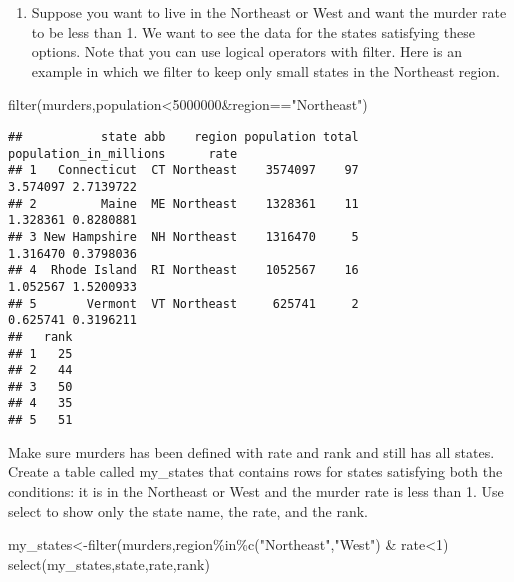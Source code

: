 \documentclass[
]{article}
\newenvironment{Shaded}{\begin{snugshade}}{\end{snugshade}}
\newcommand{\DecValTok}[1]{\textcolor[rgb]{0.00,0.00,0.81}{#1}}
\newcommand{\FunctionTok}[1]{\textcolor[rgb]{0.00,0.00,0.00}{#1}}
\newcommand{\NormalTok}[1]{#1}
\newcommand{\OtherTok}[1]{\textcolor[rgb]{0.56,0.35,0.01}{#1}}
\newcommand{\SpecialCharTok}[1]{\textcolor[rgb]{0.00,0.00,0.00}{#1}}
\newcommand{\StringTok}[1]{\textcolor[rgb]{0.31,0.60,0.02}{#1}}
\providecommand{\tightlist}{%
  \setlength{\itemsep}{0pt}\setlength{\parskip}{0pt}}
\begin{document}
\begin{enumerate}
\def\labelenumi{\arabic{enumi}.}
\setcounter{enumi}{6}
\tightlist
\item
  Suppose you want to live in the Northeast or West and want the murder
  rate to be less than 1. We want to see the data for the states
  satisfying these options. Note that you can use logical operators with
  filter. Here is an example in which we filter to keep only small
  states in the Northeast region.
\end{enumerate}

\begin{Shaded}
\begin{Highlighting}[]
\FunctionTok{filter}\NormalTok{(murders,population}\SpecialCharTok{\textless{}}\DecValTok{5000000}\SpecialCharTok{\&}\NormalTok{region}\SpecialCharTok{==}\StringTok{"Northeast"}\NormalTok{)}
\end{Highlighting}
\end{Shaded}

\begin{verbatim}
##           state abb    region population total population_in_millions      rate
## 1   Connecticut  CT Northeast    3574097    97               3.574097 2.7139722
## 2         Maine  ME Northeast    1328361    11               1.328361 0.8280881
## 3 New Hampshire  NH Northeast    1316470     5               1.316470 0.3798036
## 4  Rhode Island  RI Northeast    1052567    16               1.052567 1.5200933
## 5       Vermont  VT Northeast     625741     2               0.625741 0.3196211
##   rank
## 1   25
## 2   44
## 3   50
## 4   35
## 5   51
\end{verbatim}

Make sure murders has been defined with rate and rank and still has all
states. Create a table called my\_states that contains rows for states
satisfying both the conditions: it is in the Northeast or West and the
murder rate is less than 1. Use select to show only the state name, the
rate, and the rank.

\begin{Shaded}
\begin{Highlighting}[]
\NormalTok{my\_states}\OtherTok{\textless{}{-}}\FunctionTok{filter}\NormalTok{(murders,region}\SpecialCharTok{\%in\%}\FunctionTok{c}\NormalTok{(}\StringTok{"Northeast"}\NormalTok{,}\StringTok{"West"}\NormalTok{) }\SpecialCharTok{\&}\NormalTok{ rate}\SpecialCharTok{\textless{}}\DecValTok{1}\NormalTok{)}
\FunctionTok{select}\NormalTok{(my\_states,state,rate,rank)}
\end{Highlighting}
\end{Shaded}
\end{document}
